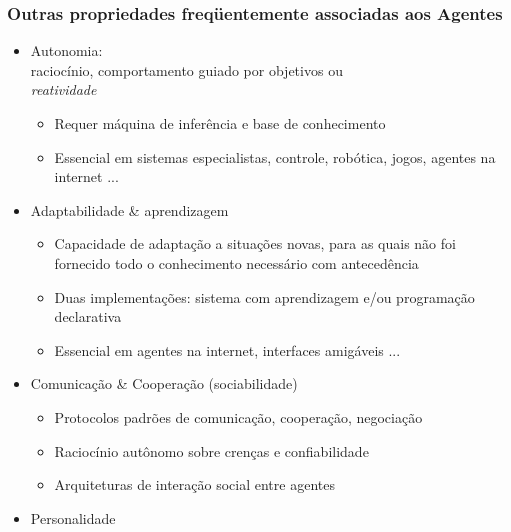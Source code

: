 \begin{frame} [allowframebreaks=0.9]

    \frametitle{Outras propriedades freqüentemente associadas aos Agentes}

 
    \begin{itemize}
      \item Autonomia:\\
raciocínio, comportamento guiado por objetivos ou \\
\textit{reatividade}

\begin{itemize}
  \item Requer máquina de inferência e base de conhecimento
  \item Essencial em sistemas especialistas, controle, robótica, jogos, agentes na internet ...
\end{itemize}
      
    \item Adaptabilidade \& aprendizagem
             
    \begin{itemize}
             
    \item Capacidade de adaptação a situações novas, para as quais não foi fornecido todo o      conhecimento necessário com antecedência 

     \item Duas implementações: sistema com  
           aprendizagem 
           e/ou programação declarativa
  
     \item Essencial em agentes na internet, interfaces amigáveis ...
   
    \end{itemize}
             
             
    \item Comunicação \& Cooperação (sociabilidade)
         \begin{itemize}
          \item  Protocolos padrões de comunicação, cooperação, negociação
          \item  Raciocínio autônomo sobre crenças e confiabilidade
          \item  Arquiteturas de interação social entre agentes
                      
         \end{itemize}
         
                
    \item Personalidade
    

\end{itemize}
\end{frame}
